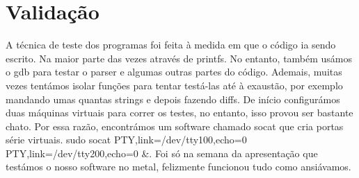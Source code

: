 \documentclass[a4paper]{article}
\begin{document}
\section{Validação}
A técnica de teste dos programas foi feita à medida em que o código ia sendo
escrito. Na maior parte das vezes através de printfs. No entanto, também usámos
o gdb para testar o parser e algumas outras partes do código. Ademais, muitas
vezes tentámos isolar funções para tentar testá-las até à exaustão, por exemplo
mandando umas quantas strings e depois fazendo diffs. De início configurámos duas
máquinas virtuais para correr os testes, no entanto, isso provou ser bastante
chato. Por essa razão, encontrámos um software chamado socat que cria portas
série virtuais. sudo socat PTY,link=/dev/tty100,echo=0
PTY,link=/dev/tty200,echo=0 \&. Foi só na semana da apresentação que testámos o
nosso software no metal, felizmente funcionou tudo como ansiávamos.

\end{document}

